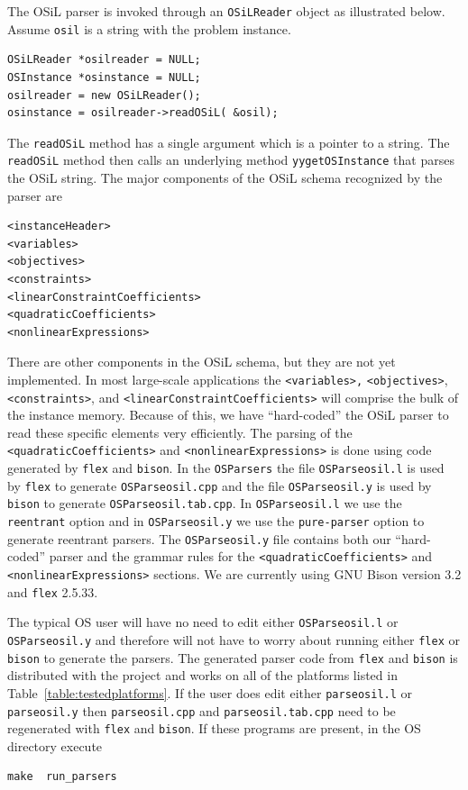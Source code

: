 \documentclass[11pt]{article}
\renewcommand{\_}{{\char"5F}}
\renewcommand{\{}{{\char"7B}}
\renewcommand{\}}{{\char"7D}}
\renewcommand{\^}{{\char"0D}}
\renewcommand{\'}{{\char"0D}}
\begin{document}
\begin{enumerate}[Step 1:]
The OSiL parser is invoked through an {\tt OSiLReader} object as illustrated below. Assume {\tt osil} is a string with the problem instance.
\begin{verbatim}
OSiLReader *osilreader = NULL;
OSInstance *osinstance = NULL;
osilreader = new OSiLReader();
osinstance = osilreader->readOSiL( &osil);
\end{verbatim}
The {\tt  readOSiL} method  has a single argument which is a pointer to a string. The {\tt  readOSiL} method then calls an underlying method {\tt yygetOSInstance} that parses the OSiL string. The major components of the OSiL schema  recognized by the parser are
\begin{verbatim}
<instanceHeader>
<variables>
<objectives>
<constraints>
<linearConstraintCoefficients>
<quadraticCoefficients>
<nonlinearExpressions>
\end{verbatim}
There are other components in the OSiL schema, but they are not yet implemented.
In most large-scale applications the {\tt <variables>,} {\tt <objectives>}, {\tt <constraints>}, and {\tt <linearConstraintCoefficients>}
will comprise the bulk of the instance memory.  Because of this, we have ``hard-coded'' the OSiL parser
to read these specific elements very efficiently.
The parsing of the {\tt <quadraticCoefficients>} and {\tt <nonlinearExpressions>} is done using code generated
by {\tt flex} and {\tt bison}. In the {\tt OSParsers}  the file  
{\tt OSParseosil.l} is used by {\tt flex} to generate {\tt OSParseosil.cpp} and the file 
{\tt OSParseosil.y} is used by {\tt bison} to generate {\tt OSParseosil.tab.cpp}.
In {\tt OSParseosil.l} we use the {\tt reentrant} option and in {\tt OSParseosil.y} we use the
{\tt pure-parser} option to generate reentrant parsers. The {\tt OSParseosil.y} file  contains both our
``hard-coded'' parser and the grammar rules for the  {\tt <quadraticCoefficients>} and
{\tt <nonlinearExpressions>} sections.
We are currently using GNU Bison version 3.2 and {\tt flex} 2.5.33.

The typical OS user will have no need to edit either {\tt OSParseosil.l} or {\tt OSParseosil.y} 
and therefore will not have to worry about running either {\tt flex} or {\tt bison} to generate the parsers. 
The generated parser code from {\tt flex} and {\tt bison} is distributed with the project and works on all 
of the platforms listed in Table~\ref{table:testedplatforms}.  If the user does edit either {\tt parseosil.l} 
or {\tt parseosil.y} then {\tt parseosil.cpp} and {\tt parseosil.tab.cpp} need to be regenerated with 
{\tt flex} and {\tt bison}. If these programs are present, in the OS directory  execute
\begin{verbatim}
make  run_parsers
\end{verbatim}


\end{enumerate}
\end{document}
